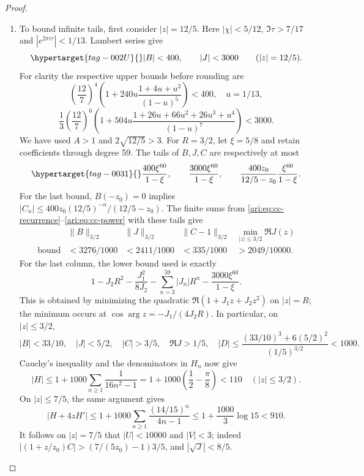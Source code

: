 \begin{proof}
\begin{enumerate}[label=\arabic*.,leftmargin=*]
\item To bound infinite tails, first consider $|z|=12/5$.
Here $|\chi|<5/12$, $\Im\tau>7/17$ and
$|e^{2\pi i\tau}|<1/13$. Lambert series give
\begin{equation}\hypertarget{tag-002U}{}\label{ari:eq:cc-outer}
 |B|<400,\qquad |J|<3000\qquad (|z|=12/5).
\end{equation}
For clarity the respective upper bounds before rounding are
\[
 \left(\frac{12}{7}\right)^4
 \left(1+240u\frac{1+4u+u^2}{(1-u)^5}\right)<400,
 \quad u=1/13,
\]
\[
 \frac13\left(\frac{12}{7}\right)^6
 \left(1+504u\frac{1+26u+66u^2+26u^3+u^4}{(1-u)^7}\right)<3000.
\]
We have used $A>1$ and $2\sqrt{12/5}>3$.
For $R=3/2$, let $\xi=5/8$ and retain coefficients through
degree 59. The tails of $B,J,C$ are respectively at most
\begin{equation}\hypertarget{tag-0031}{}\label{ari:eq:cc-tail60}
 \frac{400\xi^{60}}{1-\xi},\qquad
 \frac{3000\xi^{60}}{1-\xi},\qquad
 \frac{400z_0}{12/5-z_0}\frac{\xi^{60}}{1-\xi}.
\end{equation}
For the last bound, $B(-z_0)=0$ implies
$|C_n|\le400z_0(12/5)^{-n}/(12/5-z_0)$.
The finite sums from \eqref{ari:eq:cc-recurrence}--\eqref{ari:eq:cc-power}
with these tails give
\[
 \begin{array}{c|cccc}
 &\|B\|_{3/2}&\|J\|_{3/2}&\|C-1\|_{3/2}
                   &\min_{|z|\le3/2}\Re J(z)\\ \hline
 \text{bound}&<3276/1000&<2411/1000&<335/1000&>2049/10000.
 \end{array}
\]
For the last column, the lower bound used is exactly
\[
 1-J_2R^2-\frac{J_1^2}{8J_2}
       -\sum_{n=3}^{59}|J_n|R^n-
                   \frac{3000\xi^{60}}{1-\xi}.
\]
This is obtained by minimizing the quadratic
$\Re(1+J_1z+J_2z^2)$ on $|z|=R$; the minimum occurs at
$\cos\arg z=-J_1/(4J_2R)$. In particular, on $|z|\le3/2$,
\[
 |B|<33/10,\quad |J|<5/2,\quad |C|>3/5,\quad
 \Re J>1/5,\quad
 |D|\le\frac{(33/10)^3+6(5/2)^2}{(1/5)^{3/2}}<1000.
\]
Cauchy's inequality and the denominators in $H_n$ now give
\[
 |H|\le1+1000\sum_{n\ge1}\frac1{16n^2-1}
       =1+1000\left(\frac12-\frac\pi8\right)<110
                      \quad (|z|\le3/2).
\]
On $|z|\le7/5$, the same argument gives
\[
 |H+4zH'|\le1+1000\sum_{n\ge1}
                 \frac{(14/15)^n}{4n-1}
       \le1+\frac{1000}{3}\log15<910.
\]
It follows on $|z|=7/5$ that $|U|<10000$ and $|V|<3$;
indeed $|(1+z/z_0)C|>(7/(5z_0)-1)3/5$, and
$|\sqrt J|<8/5$.


\end{enumerate}
\end{proof}
